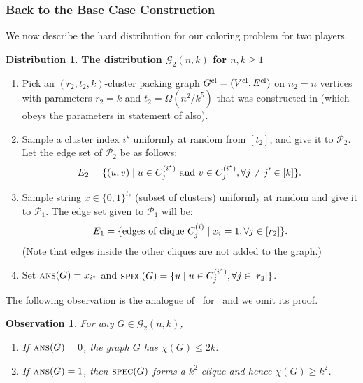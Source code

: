 \documentclass[11pt]{article}
\newtheorem{observation}[lemma]{Observation}
\theoremstyle{definition}
\newenvironment{ourbox}{\begin{mdframed}[hidealllines=false,innerleftmargin=10pt,backgroundcolor=white!10,innertopmargin=5pt,innerbottommargin=5pt,roundcorner=10pt]}{\end{mdframed}}
\newtheorem{mddistribution}{Distribution}
\newenvironment{Distribution}{\begin{ourbox}\begin{mddistribution}}{\end{mddistribution}\end{ourbox}}
\renewcommand{\leq}{\leqslant}
\renewcommand{\geq}{\geqslant}
\newcommand{\chrom}{\ensuremath{\chi}}
\newcommand{\player}[1]{\ensuremath{\mathcal{P}_{#1}}}
\newcommand{\cG}{\ensuremath{\mathcal{G}}}
\newcommand{\cliqnum}[2]{\ensuremath{C^{(#1)}_{#2}}}
\newcommand{\ans}{\ensuremath{\textnormal{\textsc{ans}}}}
\newcommand{\spec}{\ensuremath{\textnormal{\textsc{spec}}}}
\newcommand{\istar}{\ensuremath{i^{\star}}}
\begin{document}
\subsubsection{Back to the Base Case Construction}
	
	We now describe the hard distribution for our coloring problem for two players.

		\begin{Distribution}\label{dist:adv-2player}
		\textbf{The distribution $\cG_2(n,k)$ for $n, k \geq 1$}
		\begin{enumerate}[label=$(\roman*)$]
			\item Pick an $(r_2, t_2, k)$-cluster packing graph $G^{\textnormal{cl}} = (V^{\textnormal{cl}}, E^{\textnormal{cl}})$ on $n_2 = n$ vertices with parameters $r_2=k$ and $t_2 = \Omega(n^2/k^5)$ that was constructed in  (which obeys the parameters in statement of  also).
			
			\item Sample a cluster index $\istar$ uniformly at random from $[t_2]$, and give it to $\player{2}$. Let the edge set of $\player{2}$ be as follows:
			\[
				E_2 = \{ (u, v)\mid u\in \cliqnum{\istar}{j} \textnormal{ and } v\in \cliqnum{\istar}{j'}, \forall j\ne j' \in [k]\}.
			\] 
			
			\item  Sample string $x \in \{0, 1\}^{t_2}$ (subset of clusters) uniformly at random and give it to $\player{1}$.
The edge set given to $\player{1}$ will be:
			\[
				E_1 = \{\textnormal{edges of clique $\cliqnum{i}{j}$} \mid x_i = 1, \forall j \in [r_2]\}.
			\]
			(Note that edges inside the other cliques are not added to the graph.)
			
			\item Set $\ans(G)=x_{\istar}$ and $\spec(G) = \{u \mid u \in \cliqnum{\istar}{j}, \forall j\in [r_2] \}$.
			
		\end{enumerate}
	\end{Distribution}

	The following observation is the analogue of~ for~ and we omit its proof. 
		\begin{observation}\label{obs:two-player-clique}
		 For any $G\in \cG_2(n, k)$, 
		 \begin{enumerate}[label=$(\roman*)$]
			\item If $\ans(G)=0$, the graph $G$ has $\chrom(G)\leq 2k$.
			\item If $\ans(G)=1$, then $\spec(G)$ forms a $k^2$-clique and hence $\chrom(G)\geq k^2$.
		 \end{enumerate}
		\end{observation}
		
\end{document}
